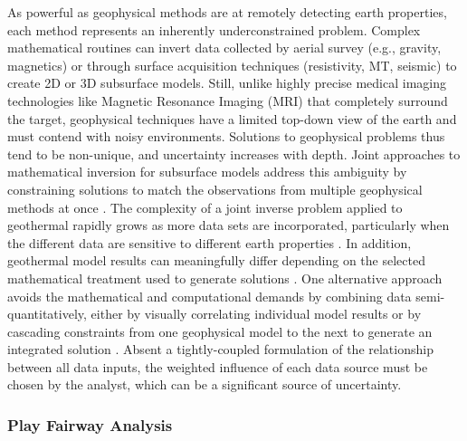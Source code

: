 As powerful as geophysical methods are at remotely detecting earth properties, each method represents an inherently underconstrained problem. Complex mathematical routines can invert data collected by aerial survey (e.g., gravity, magnetics) or through surface acquisition techniques (resistivity, MT, seismic) to create 2D or 3D subsurface models. Still, unlike highly precise medical imaging technologies like Magnetic Resonance Imaging (MRI) that completely surround the target, geophysical techniques have a limited top-down view of the earth and must contend with noisy environments. Solutions to geophysical problems thus tend to be non-unique, and uncertainty increases with depth. Joint approaches to mathematical inversion for subsurface models address this ambiguity by constraining solutions to match the observations from multiple geophysical methods at once \citep{vozoff_joint_1975}. The complexity of a joint inverse problem applied to geothermal rapidly grows as more data sets are incorporated, particularly when the different data are sensitive to different earth properties \citep{moorkamp_framework_2011}. In addition, geothermal model results can meaningfully differ depending on the selected mathematical treatment used to generate solutions \citep{rosenkjaer_comparison_2015}. One alternative approach avoids the mathematical and computational demands by combining data semi-quantitatively, either by visually correlating individual model results or by cascading constraints from one geophysical model to the next to generate an integrated solution \citep{jousset_hengill_2011, lichoro_joint_2019}. Absent a tightly-coupled formulation of the relationship between all data inputs, the weighted influence of each data source must be chosen by the analyst, which can be a significant source of uncertainty.

\subsubsection{Play Fairway Analysis}


